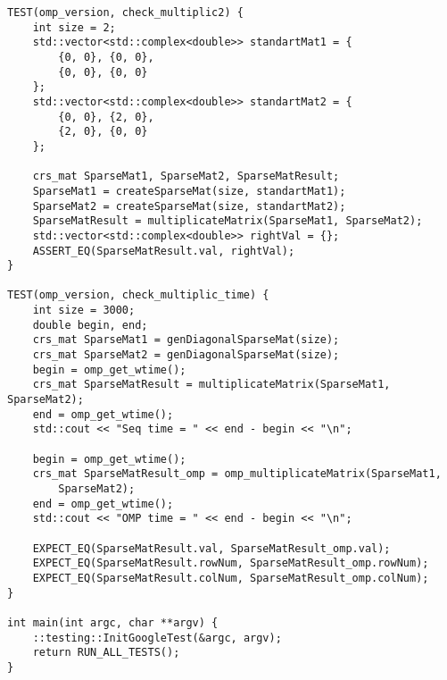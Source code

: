 \documentclass{report}
\begin{document}
\begin{lstlisting}
TEST(omp_version, check_multiplic2) {
    int size = 2;
    std::vector<std::complex<double>> standartMat1 = {
        {0, 0}, {0, 0},
        {0, 0}, {0, 0}
    };
    std::vector<std::complex<double>> standartMat2 = {
        {0, 0}, {2, 0},
        {2, 0}, {0, 0}
    };

    crs_mat SparseMat1, SparseMat2, SparseMatResult;
    SparseMat1 = createSparseMat(size, standartMat1);
    SparseMat2 = createSparseMat(size, standartMat2);
    SparseMatResult = multiplicateMatrix(SparseMat1, SparseMat2);
    std::vector<std::complex<double>> rightVal = {};
    ASSERT_EQ(SparseMatResult.val, rightVal);
}

TEST(omp_version, check_multiplic_time) {
    int size = 3000;
    double begin, end;
    crs_mat SparseMat1 = genDiagonalSparseMat(size);
    crs_mat SparseMat2 = genDiagonalSparseMat(size);
    begin = omp_get_wtime();
    crs_mat SparseMatResult = multiplicateMatrix(SparseMat1, SparseMat2);
    end = omp_get_wtime();
    std::cout << "Seq time = " << end - begin << "\n";

    begin = omp_get_wtime();
    crs_mat SparseMatResult_omp = omp_multiplicateMatrix(SparseMat1,
        SparseMat2);
    end = omp_get_wtime();
    std::cout << "OMP time = " << end - begin << "\n";

    EXPECT_EQ(SparseMatResult.val, SparseMatResult_omp.val);
    EXPECT_EQ(SparseMatResult.rowNum, SparseMatResult_omp.rowNum);
    EXPECT_EQ(SparseMatResult.colNum, SparseMatResult_omp.colNum);
}

int main(int argc, char **argv) {
    ::testing::InitGoogleTest(&argc, argv);
    return RUN_ALL_TESTS();
}
\end{lstlisting}
\end{document}
